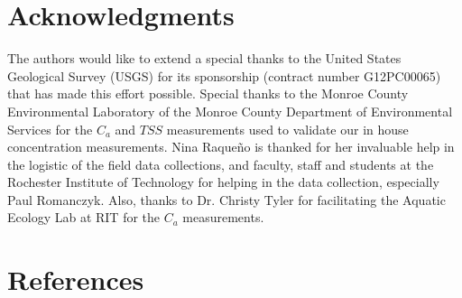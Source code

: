 \documentclass[onecolumn,3p,letterpaper]{elsarticle}
\begin{document}
\section*{Acknowledgments}
\vspace{-.2cm}
The authors would like to extend a special thanks to the United States Geological Survey (USGS) for its sponsorship (contract number G12PC00065) that has made this effort possible. Special thanks to the Monroe County Environmental Laboratory of the Monroe County Department of Environmental Services for the $C_a$ and $TSS$ measurements used to validate our in house concentration measurements. Nina Raque\~{n}o is thanked for her invaluable help in the logistic of the field data collections, and faculty, staff and students at the Rochester Institute of Technology for helping in the data collection, especially Paul Romanczyk. Also, thanks to Dr. Christy Tyler for facilitating the Aquatic Ecology Lab at RIT for the $C_a$ measurements.
\section*{References}


%

%






% 
% 

\end{document}
